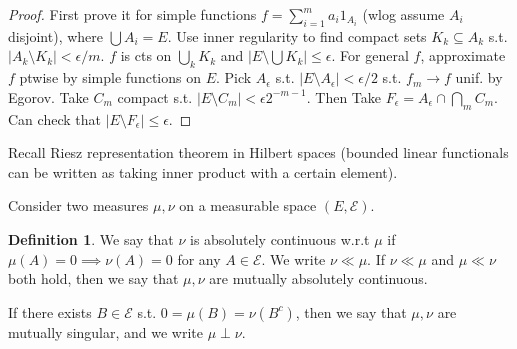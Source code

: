 \documentclass{article}
\theoremstyle{definition}
\newtheorem{defn}{Definition}[section]
\theoremstyle{remark}
\theoremstyle{plain}
\begin{document}
\begin{proof}
    First prove it for simple functions $f=\sum_{i=1}^ma_i1_{A_i}$ (wlog assume $A_i$ disjoint), where $\bigcup A_i=E$. Use inner regularity to find compact sets $K_k\subseteq A_k$ s.t. $|A_k\setminus K_k|<\epsilon/m$. $f$ is cts on $\bigcup_k K_k$ and $|E\setminus\bigcup K_k|\le\epsilon$. For general $f$, approximate $f$ ptwise by simple functions on $E$. Pick $A_\epsilon$ s.t. $|E\setminus A_\epsilon|<\epsilon/2$ s.t. $f_m\to f$ unif. by Egorov. Take $C_m$ compact s.t. $|E\setminus C_m|<\epsilon 2^{-m-1}$. Then Take $F_\epsilon=A_\epsilon\cap\bigcap_mC_m$. Can check that $|E\setminus F_\epsilon|\le\epsilon$.
\end{proof}
Recall Riesz representation theorem in Hilbert spaces (bounded linear functionals can be written as taking inner product with a certain element).

Consider two measures $\mu,\nu$ on a measurable space $(E,\mathcal E)$. 
\begin{defn}
    We say that $\nu$ is absolutely continuous w.r.t $\mu$ if $\mu(A)=0\implies\nu(A)=0$ for any $A\in\mathcal E$. We write $\nu\ll\mu$. If $\nu\ll\mu$ and $\mu\ll\nu$ both hold, then we say that $\mu,\nu$ are mutually absolutely continuous.

    If there exists $B\in\mathcal E$ s.t. $0=\mu(B)=\nu(B^c)$, then we say that $\mu,\nu$ are mutually singular, and we write $\mu\perp\nu$.
\end{defn}
\end{document}
